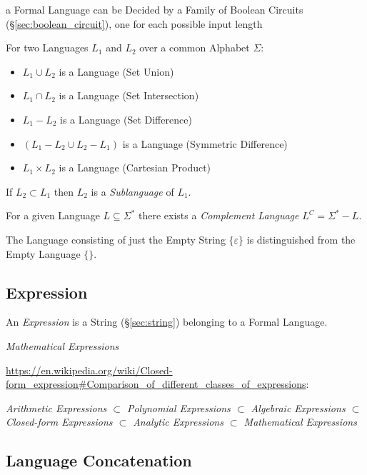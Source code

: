 a Formal Language can be Decided by a Family of Boolean Circuits
(\S\ref{sec:boolean_circuit}), one for each possible input length

For two Languages $L_1$ and $L_2$ over a common Alphabet $\Sigma$:
\begin{itemize}
  \item $L_1 \cup L_2$ is a Language (Set Union)
  \item $L_1 \cap L_2$ is a Language (Set Intersection)
  \item $L_1 - L_2$ is a Language (Set Difference)
  \item $(L_1 - L_2 \cup L_2 - L_1)$ is a Language (Symmetric Difference)
  \item $L_1 \times L_2$ is a Language (Cartesian Product)
\end{itemize}
If $L_2 \subset L_1$ then $L_2$ is a \emph{Sublanguage} of $L_1$.

For a given Language $L \subseteq \Sigma^*$ there exists a \emph{Complement
  Language} $L^C = \Sigma^* - L$.

The Language consisting of just the Empty String $\{\varepsilon\}$ is
distinguished from the Empty Language $\{\}$.



\subsection{Expression}\label{sec:expression}

An \emph{Expression} is a String (\S\ref{sec:string}) belonging to a Formal
Language.

\emph{Mathematical Expressions}

\url{https://en.wikipedia.org/wiki/Closed-form_expression#Comparison_of_different_classes_of_expressions}:

\emph{
Arithmetic Expressions $\subset$ Polynomial Expressions $\subset$ Algebraic
Expressions $\subset$ Closed-form Expressions $\subset$ Analytic Expressions
$\subset$ Mathematical Expressions
}




\subsection{Language Concatenation}\label{sec:language_concatenation}

